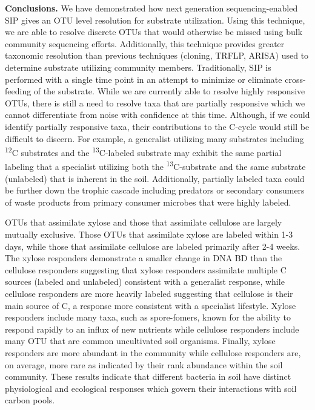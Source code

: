 \textbf{Conclusions.} We have demonstrated how next generation sequencing-enabled SIP gives an OTU level resolution for substrate utilization. Using this technique, we are able to resolve discrete OTUs that would otherwise be missed using bulk community sequencing efforts. Additionally, this technique provides greater taxonomic resolution than previous techniques (cloning, TRFLP, ARISA) used to determine substrate utilizing community members. Traditionally, SIP is performed with a single time point in an attempt to minimize or eliminate cross-feeding of the substrate. While we are currently able to resolve highly responsive OTUs, there is still a need to resolve taxa that are partially responsive which we cannot differentiate from noise with confidence at this time. Although, if we could identify partially responsive taxa, their contributions to the C-cycle would still be difficult to discern. For example, a generalist utilizing many substrates including \textsuperscript{12}C substrates and the \textsuperscript{13}C-labeled substrate may exhibit the same partial labeling that a specialist utilizing both the \textsuperscript{13}C-substrate and the same substrate (unlabeled) that is inherent in the soil. Additionally, partially labeled taxa could be further down the trophic cascade including predators or secondary consumers of waste products from primary consumer microbes that were highly labeled.   

OTUs that assimilate xylose and those that assimilate cellulose are largely mutually exclusive. Those OTUs that assimilate xylose are labeled within 1-3 days, while those that assimilate cellulose are labeled primarily after 2-4 weeks. The xylose responders demonstrate a smaller change in DNA BD than the cellulose responders suggesting that xylose responders assimilate multiple C sources (labeled and unlabeled) consistent with a generalist response, while cellulose responders are more heavily labeled suggesting that cellulose is their main source of C, a response more consistent with a specialist lifestyle. Xylose responders include many taxa, such as spore-fomers, known for the ability to respond rapidly to an influx of new nutrients while cellulose responders include many OTU that are common uncultivated soil organisms. Finally, xylose responders are more abundant in the community while cellulose responders are, on average, more rare as indicated by their rank abundance within the soil community. These results indicate that different bacteria in soil have distinct physiological and ecological responses which govern their interactions with soil carbon pools. 

